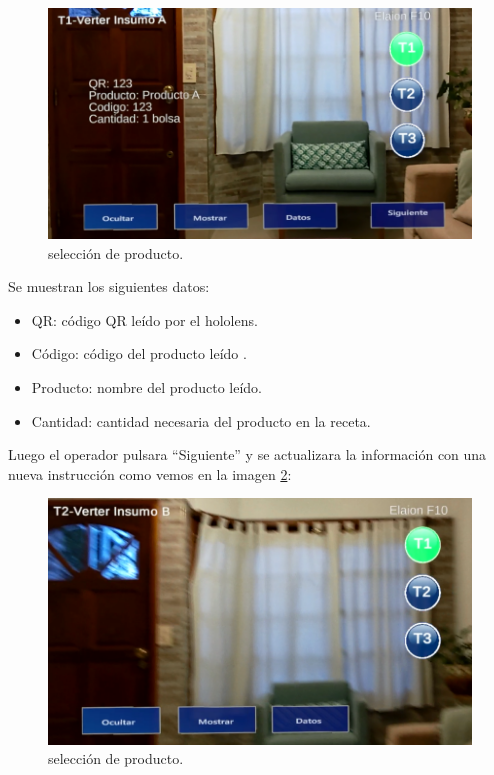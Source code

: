 \begin{figure}[htpb]
	\centering
	\includegraphics[scale=.5]{./Figures/i9.PNG}
	\caption{selección de producto\protect\footnotemark.}
	\label{fig:i9}
\end{figure}

\vspace{60px}
Se muestran los siguientes datos:

\begin{itemize}
\item QR: código QR leído por el hololens.
\item Código: código del producto leído .
\item Producto: nombre del producto leído. 
\item Cantidad: cantidad necesaria del producto en la receta.
\end{itemize}

Luego el operador pulsara ``Siguiente'' y se actualizara la información con una nueva instrucción como vemos en la imagen \ref{fig:i11}:

\begin{figure}[htpb]
	\centering
	\includegraphics[scale=.5]{./Figures/i11.PNG}
	\caption{selección de producto\protect\footnotemark.}
	\label{fig:i11}
\end{figure}

